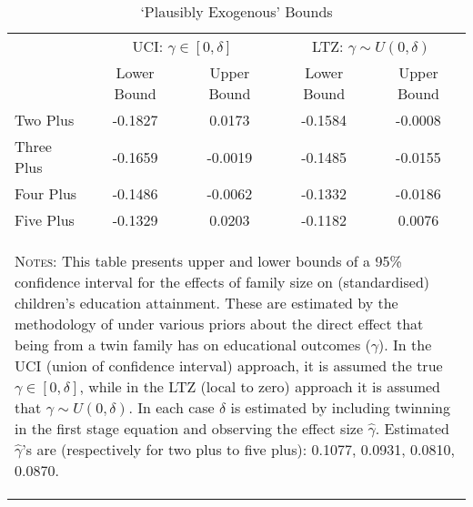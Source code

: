 \begin{table}[htpb!]\caption{`Plausibly Exogenous' Bounds} 
\label{TWINtab:Conley}\vspace{-5mm}\begin{center}\begin{tabular}{lcccc}
\toprule \toprule 
&\multicolumn{2}{c}{UCI: $\gamma\in [0,\delta]$}&\multicolumn{2}{c}{LTZ: $\gamma \sim U(0,\delta)$}\\ 
\cmidrule(r){2-3} \cmidrule(r){4-5}
&Lower Bound&Upper Bound&Lower Bound&Upper Bound\\
Two Plus&-0.1827&0.0173&-0.1584&-0.0008\\
Three Plus&-0.1659&-0.0019&-0.1485&-0.0155\\
Four Plus&-0.1486&-0.0062&-0.1332&-0.0186\\
Five Plus&-0.1329&0.0203&-0.1182&0.0076\\
\midrule\multicolumn{5}{p{11.6cm}}{\begin{footnotesize}\textsc{Notes:} This table presents upper and lower bounds of a 95\% confidence interval for the effects of family size on (standardised) children's education attainment. These are estimated by the methodology of \citet{Conleyetal2012}  under various priors about the direct effect that being from a twin family has on educational outcomes ($\gamma$). In the UCI (union of confidence interval) approach, it is assumed the true $\gamma\in[0,\delta]$, while in the LTZ (local to zero) approach it is assumed that $\gamma\sim U(0,\delta)$.  In each case $\delta$ is estimated by including twinning in the first stage  equation and observing the effect size $\hat\gamma$.  Estimated $\hat\gamma$'s are (respectively for two plus to five plus):   0.1077, 0.0931, 0.0810, 0.0870.\end{footnotesize}}  
\\ \bottomrule \end{tabular}\end{center}\end{table} 
